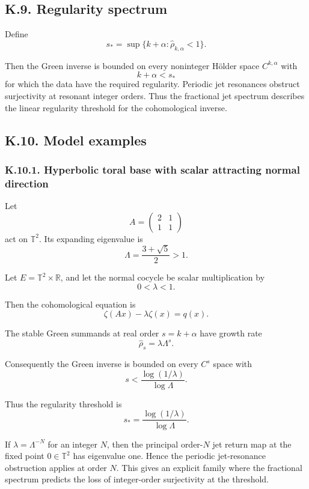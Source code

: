 \documentclass[12pt,a4paper]{article}
\theoremstyle{plain}
\numberwithin{equation}{section}
\numberwithin{theorem}{section}
\begin{document}
\subsection{K.9. Regularity spectrum}

Define
\[
s_*=\sup\{k+\alpha:
\widehat\rho_{k,\alpha}<1\}.
\tag{K.9.1}
\]

Then the Green inverse is bounded on every noninteger H\"older space $C^{k,\alpha}$ with
\[
k+\alpha<s_*
\]
for which the data have the required regularity. Periodic jet resonances obstruct surjectivity at resonant integer orders. Thus the fractional jet spectrum describes the linear regularity threshold for the cohomological inverse.

\subsection{K.10. Model examples}

\subsubsection{K.10.1. Hyperbolic toral base with scalar attracting normal direction}

Let
\[
A=
\begin{pmatrix}
2&1\\
1&1
\end{pmatrix}
\]
act on $\mathbb T^2$. Its expanding eigenvalue is
\[
\Lambda=\frac{3+\sqrt5}{2}>1.
\]

Let $E=\mathbb T^2\times\mathbb R$, and let the normal cocycle be scalar multiplication by
\[
0<\lambda<1.
\]

Then the cohomological equation is
\[
\zeta(Ax)-\lambda\zeta(x)=q(x).
\]

The stable Green summands at real order $s=k+\alpha$ have growth rate
\[
\widehat\rho_s=
\lambda\Lambda^s.
\]

Consequently the Green inverse is bounded on every $C^s$ space with
\[
s<\frac{\log(1/\lambda)}{
\log\Lambda}.
\]

Thus the regularity threshold is
\[
s_*=
\frac{\log(1/\lambda)}{
\log\Lambda}.
\]

If $\lambda=\Lambda^{-N}$ for an integer $N$, then the principal order-$N$ jet return map at the fixed point $0\in\mathbb T^2$ has eigenvalue one. Hence the periodic jet-resonance obstruction applies at order $N$. This gives an explicit family where the fractional spectrum predicts the loss of integer-order surjectivity at the threshold.
\end{document}
